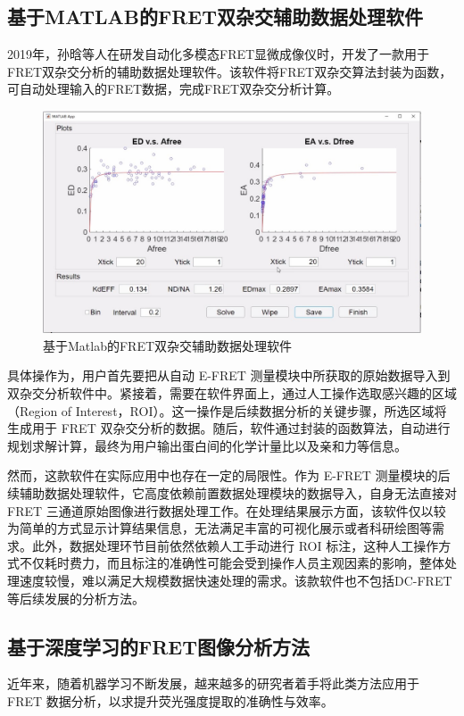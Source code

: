 \subsection{基于MATLAB的FRET双杂交辅助数据处理软件}

\ifshowtext

2019年，孙晗等人在研发自动化多模态FRET显微成像仪时，开发了一款用于FRET双杂交分析的辅助数据处理软件。该软件将FRET双杂交算法封装为函数，可自动处理输入的FRET数据，完成FRET双杂交分析计算。

\begin{figure}[htbp]
    \centering
    \includegraphics[width=0.5\linewidth]{../figures/1/1_matlab双杂交.jpg}
    \caption{基于Matlab的FRET双杂交辅助数据处理软件}
    \label{fig:matlab}
\end{figure}

具体操作为，用户首先要把从自动 E-FRET 测量模块中所获取的原始数据导入到双杂交分析软件中。紧接着，需要在软件界面上，通过人工操作选取感兴趣的区域（Region of Interest，ROI）。这一操作是后续数据分析的关键步骤，所选区域将生成用于 FRET 双杂交分析的数据。随后，软件通过封装的函数算法，自动进行规划求解计算，最终为用户输出蛋白间的化学计量比以及亲和力等信息。

然而，这款软件在实际应用中也存在一定的局限性。作为 E-FRET 测量模块的后续辅助数据处理软件，它高度依赖前置数据处理模块的数据导入，自身无法直接对 FRET 三通道原始图像进行数据处理工作。在处理结果展示方面，该软件仅以较为简单的方式显示计算结果信息，无法满足丰富的可视化展示或者科研绘图等需求。此外，数据处理环节目前依然依赖人工手动进行 ROI 标注，这种人工操作方式不仅耗时费力，而且标注的准确性可能会受到操作人员主观因素的影响，整体处理速度较慢，难以满足大规模数据快速处理的需求。该款软件也不包括DC-FRET等后续发展的分析方法。
\fi

\subsection{基于深度学习的FRET图像分析方法}

\ifshowtext
近年来，随着机器学习不断发展，越来越多的研究者着手将此类方法应用于 FRET 数据分析，以求提升荧光强度提取的准确性与效率。

